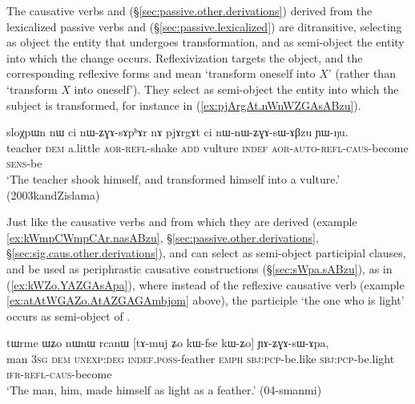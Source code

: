 
The causative verbs  and  (§\ref{sec:passive.other.derivations}) derived from the lexicalized passive verbs  and  (§\ref{sec:passive.lexicalized}) are ditransitive, selecting as object the entity that undergoes transformation, and as semi-object the entity into which the change occurs. Reflexivization targets the object, and the corresponding reflexive forms   and  mean `transform oneself into $X$' (rather than `transform $X$ into oneself'). They select as semi-object the entity into which the subject is transformed, for instance  in (\ref{ex:pjArgAt.nWnWZGAsABzu}).

\begin{exe}
\ex \label{ex:pjArgAt.nWnWZGAsABzu}
\gll sloχpɯn nɯ ci nɯ-ʑɣɤ-sɤpʰɤr nɤ pjɤrgɤt ci nɯ-nɯ-ʑɣɤ-sɯ-ɤβzu ɲɯ-ŋu. \\
teacher \textsc{dem} a.little \textsc{aor}-\textsc{refl}-shake \textsc{add} vulture \textsc{indef} \textsc{aor}-\textsc{auto}-\textsc{refl}-\textsc{caus}-become \textsc{sens}-be \\
 \glt `The teacher shook himself, and transformed himself into a vulture.'  (2003kandZislama)
\end{exe}

Just like the causative verbs   and  from which they are derived (example \ref{ex:kWmpCWmpCAr.nasABzu}, §\ref{sec:passive.other.derivations}, §\ref{sec:sig.caus.other.derivations}),  and  can select as semi-object participial clauses, and be used as periphrastic causative constructions (§\ref{sec:sWpa.sABzu}), as in (\ref{ex:kWZo.YAZGAsApa}), where instead of the reflexive causative verb  (example \ref{ex:atAtWGAZo.AtAZGAGAmbjom} above), the participle  `the one who is light' occurs as semi-object of .

 
\begin{exe}
\ex \label{ex:kWZo.YAZGAsApa}
\gll tɯrme ɯʑo nɯnɯ rcanɯ [tɤ-muj ʑo kɯ-fse kɯ-ʑo] ɲɤ-ʑɣɤ-sɯ-ɤpa, \\
man \textsc{3sg} \textsc{dem} \textsc{unexp}:\textsc{deg} \textsc{indef}.\textsc{poss}-feather \textsc{emph} \textsc{sbj}:\textsc{pcp}-be.like \textsc{sbj}:\textsc{pcp}-be.light \textsc{ifr}-\textsc{refl}-\textsc{caus}-become \\
\glt `The man, him, made himself as light as a feather.' (04-smanmi)
\end{exe}

